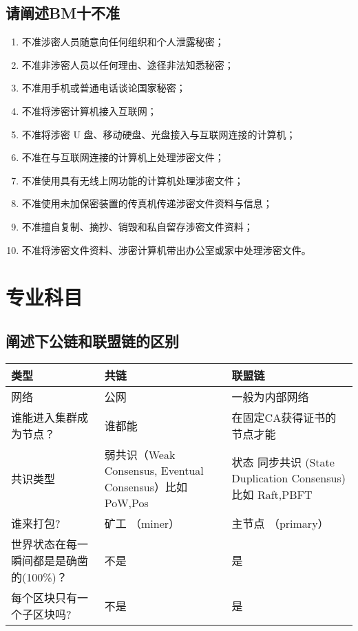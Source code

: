 \documentclass[dvipsnames]{ctexart}
\begin{document}
\subsection*{请阐述BM十不准}
\begin{enumerate}
\item 不准涉密人员随意向任何组织和个人泄露秘密；
\item 不准非涉密人员以任何理由、途径非法知悉秘密；
\item 不准用手机或普通电话谈论国家秘密；
\item 不准将涉密计算机接入互联网；
\item 不准将涉密 U 盘、移动硬盘、光盘接入与互联网连接的计算机；
\item 不准在与互联网连接的计算机上处理涉密文件；
\item 不准使用具有无线上网功能的计算机处理涉密文件；
\item 不准使用未加保密装置的传真机传递涉密文件资料与信息；
\item 不准擅自复制、摘抄、销毁和私自留存涉密文件资料；
\item 不准将涉密文件资料、涉密计算机带出办公室或家中处理涉密文件。
\end{enumerate}

\section*{专业科目}
\subsection*{阐述下公链和联盟链的区别}
\begin{center}
  \begin{tabularx}{0.8\textwidth} { 
       >{\raggedright\arraybackslash}X 
       >{\centering\arraybackslash}X 
       >{\raggedleft\arraybackslash}X  }
     \toprule
     \textbf{类型} & \textbf{共链} & \textbf{联盟链} \\
     \midrule
     网络  & 公网  & 一般为内部网络  \\
     \hline
     谁能进入集群成为节点？  & 谁都能  & 在固定CA获得证书的节点才能  \\
     \hline
     共识类型 & 弱共识（Weak Consensus, Eventual Consensus）比如 PoW,Pos & 状态
     同步共识 (State Duplication Consensus) 比如 Raft,PBFT\\
     \hline
     谁来打包? & 矿工 （miner） & 主节点 （primary）\\
     \hline
     世界状态在每一瞬间都是是确凿的(100\%)？ & 不是 & 是\\
     \hline
     每个区块只有一个子区块吗? &不是&是\\
     \bottomrule
\end{tabularx}
\end{center}
\end{document}
